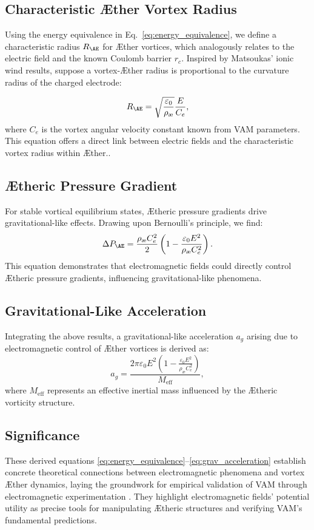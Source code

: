 \documentclass[a4paper,12pt]{article}
\begin{document}
\subsection{Characteristic Æther Vortex Radius}
Using the energy equivalence in Eq.~\eqref{eq:energy_equivalence}, we define a characteristic radius $R_{\AE}$ for Æther vortices, which analogously
relates to the electric field and the known Coulomb barrier $r_c$.  Inspired by Matsoukas' ionic wind results, suppose a vortex-Æther radius is
proportional to the curvature radius of the charged electrode:

\begin{equation}\label{eq:vortex_radius}
R_{\AE} = \sqrt{\frac{\varepsilon_0}{\rho_\text{\ae}}}\frac{E}{C_e},
\end{equation}
where $C_e$ is the vortex angular velocity constant known from VAM parameters.
This equation offers a direct link between electric fields and the characteristic vortex radius within Æther.\cite{RelationsBetweenConstants2005}.
\subsection{Ætheric Pressure Gradient}
For stable vortical equilibrium states, Ætheric pressure gradients drive gravitational-like effects. Drawing upon Bernoulli's principle, we find:
\begin{equation}\label{eq:pressure_gradient}
\Delta P_{\AE} = \frac{\rho_\text{\ae} C_e^2}{2}\left(1 - \frac{\varepsilon_0 E^2}{\rho_\text{\ae} C_e^2}\right).
\end{equation}
This equation demonstrates that electromagnetic fields could directly control Ætheric pressure gradients, influencing gravitational-like phenomena.
\subsection{Gravitational-Like Acceleration}
Integrating the above results, a gravitational-like acceleration $a_g$ arising due to electromagnetic control of Æther vortices is derived as:
\begin{equation}\label{eq:grav_acceleration}
a_{g} = \frac{2\pi \varepsilon_0 E^2\left(1 - \frac{\varepsilon_0 E^2}{\rho_\text{\ae}C_e^2}\right)}{M_\text{eff}},
\end{equation}
where $M_\text{eff}$ represents an effective inertial mass influenced by the Ætheric vorticity structure.
\subsection{Significance}
These derived equations \eqref{eq:energy_equivalence}--\eqref{eq:grav_acceleration} establish concrete theoretical connections between electromagnetic phenomena and vortex Æther dynamics, laying the groundwork for empirical validation of VAM through electromagnetic experimentation \cite{Podkletnov2007, Kleckner2013}. They highlight electromagnetic fields' potential utility as precise tools for manipulating Ætheric structures and verifying VAM's fundamental predictions.
\end{document}

